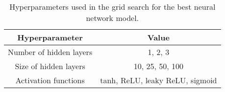 \begin{table}[h!]
    \centering
    \begin{tabular}{|c|c|}
    \hline
        \textbf{Hyperparameter} & \textbf{Value}  \\ \hline
        Number of hidden layers & 1, 2, 3  \\ \hline
        Size of hidden layers & 10, 25, 50, 100 \\\hline
        Activation functions & tanh, ReLU, leaky ReLU, sigmoid \\ \hline
    \end{tabular}
    \caption{Hyperparameters used in the grid search for the best neural network model.}
    \label{tab:hyperparams}
\end{table}
